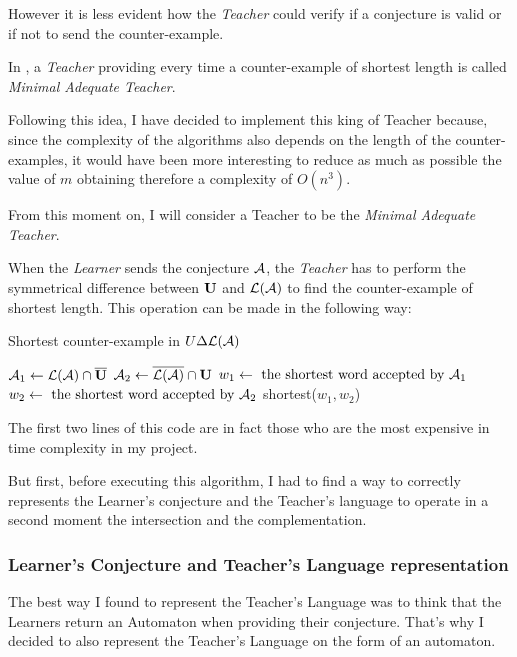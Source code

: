 However it is less evident how the \textit{Teacher} could verify if a conjecture is valid or if not to send the counter-example.

\begin{definition}
  In \cite{LPaper}, a \textit{Teacher} providing every time a counter-example of shortest length is called \textit{Minimal Adequate Teacher}.
\end{definition}

Following this idea, I have decided to implement this king of Teacher because, since the complexity of the algorithms also depends on the length of the counter-examples, it would have been more interesting to reduce as much as possible the value of $m$ obtaining therefore a complexity of $O(n^3)$.

From this moment on, I will consider a Teacher to be the \textit{Minimal Adequate Teacher}.

When the \textit{Learner} sends the conjecture $\mathcal{A}$, the \textit{Teacher} has to perform the symmetrical difference between $\mathbf{U}$ and $\mathcal{L}(\mathcal{A})$ to find the counter-example of shortest length. This operation can be made in the following way:

\begin{algorithm}
  \caption{Shortest counter-example in $U \Delta \mathcal{L}(\mathcal{A})$}
  $\mathcal{A}_1 \gets \mathcal{L}(\mathcal{A}) \cap \overline{\mathbf{U}}$\;
  $\mathcal{A}_2 \gets \overline{\mathcal{L}(\mathcal{A})} \cap \mathbf{U}$\;
  $w_1 \gets \text{ the shortest word accepted by } \mathcal{A}_1$\;
  $w_2 \gets \text{ the shortest word accepted by } \mathcal{A}_2$\;
  \Return shortest($w_1, w_2$)\;
\end{algorithm}

The first two lines of this code are in fact those who are the most expensive in time complexity in my project.

But first, before executing this algorithm, I had to find a way to correctly represents the Learner's conjecture and the Teacher's language to operate in a second moment the intersection and the complementation.

\subsubsection{Learner's Conjecture and Teacher's Language representation}

The best way I found to represent the Teacher's Language was to think that the Learners return an Automaton when providing their conjecture. That's why I decided to also represent the Teacher's Language on the form of an automaton.

